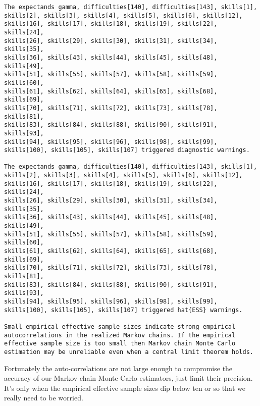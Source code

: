 \documentclass[
  letterpaper,
  DIV=11,
  numbers=noendperiod]{scrartcl}
\begin{document}
\begin{verbatim}
The expectands gamma, difficulties[140], difficulties[143], skills[1],
skills[2], skills[3], skills[4], skills[5], skills[6], skills[12],
skills[16], skills[17], skills[18], skills[19], skills[22], skills[24],
skills[26], skills[29], skills[30], skills[31], skills[34], skills[35],
skills[36], skills[43], skills[44], skills[45], skills[48], skills[49],
skills[51], skills[55], skills[57], skills[58], skills[59], skills[60],
skills[61], skills[62], skills[64], skills[65], skills[68], skills[69],
skills[70], skills[71], skills[72], skills[73], skills[78], skills[81],
skills[83], skills[84], skills[88], skills[90], skills[91], skills[93],
skills[94], skills[95], skills[96], skills[98], skills[99],
skills[100], skills[105], skills[107] triggered diagnostic warnings.

The expectands gamma, difficulties[140], difficulties[143], skills[1],
skills[2], skills[3], skills[4], skills[5], skills[6], skills[12],
skills[16], skills[17], skills[18], skills[19], skills[22], skills[24],
skills[26], skills[29], skills[30], skills[31], skills[34], skills[35],
skills[36], skills[43], skills[44], skills[45], skills[48], skills[49],
skills[51], skills[55], skills[57], skills[58], skills[59], skills[60],
skills[61], skills[62], skills[64], skills[65], skills[68], skills[69],
skills[70], skills[71], skills[72], skills[73], skills[78], skills[81],
skills[83], skills[84], skills[88], skills[90], skills[91], skills[93],
skills[94], skills[95], skills[96], skills[98], skills[99],
skills[100], skills[105], skills[107] triggered hat{ESS} warnings.

Small empirical effective sample sizes indicate strong empirical
autocorrelations in the realized Markov chains. If the empirical
effective sample size is too small then Markov chain Monte Carlo
estimation may be unreliable even when a central limit theorem holds.
\end{verbatim}

Fortunately the auto-correlations are not large enough to compromise the
accuracy of our Markov chain Monte Carlo estimators, just limit their
precision. It's only when the empirical effective sample sizes dip below
ten or so that we really need to be worried.
\end{document}
